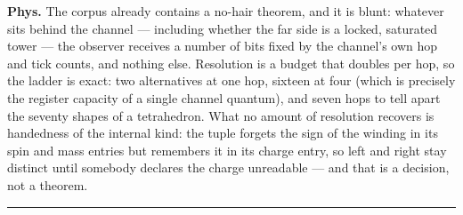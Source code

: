 \documentclass[11pt,openany]{report}
\theoremstyle{canonplain}
\theoremstyle{canondef}
\begin{document}
\textbf{Phys.} The corpus already contains a no-hair theorem, and it is blunt: whatever sits behind the channel — including whether the far side is a locked, saturated tower — the observer receives a number of bits fixed by the channel's own hop and tick counts, and nothing else. Resolution is a budget that doubles per hop, so the ladder is exact: two alternatives at one hop, sixteen at four (which is precisely the register capacity of a single channel quantum), and seven hops to tell apart the seventy shapes of a tetrahedron. What no amount of resolution recovers is handedness of the internal kind: the tuple forgets the sign of the winding in its spin and mass entries but remembers it in its charge entry, so left and right stay distinct until somebody declares the charge unreadable — and that is a decision, not a theorem.

\vspace{2pt}\noindent\rule{\textwidth}{0.4pt}\vspace{2pt}

\medskip
\end{document}
